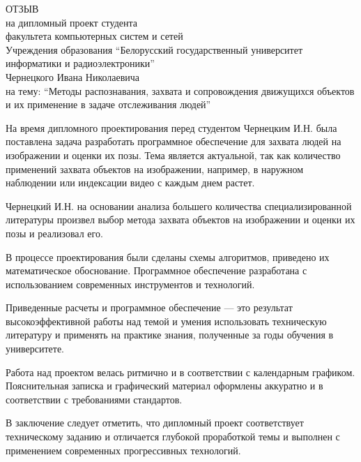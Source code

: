 \thispagestyle{empty}

\begin{singlespace}
  {\small
    \begin{center}
      \begin{minipage}{0.8\textwidth}
        \begin{center}
          {\normalsize ОТЗЫВ}\\[0.2cm]
          на дипломный проект студента\\
          факультета компьютерных систем и сетей\\
          Учреждения образования ``Белорусский государственный университет информатики и радиоэлектроники''\\
          Чернецкого Ивана Николаевича\\
          на тему: ``Методы распознавания, захвата и сопровождения движущихся объектов и их применение в задаче отслеживания людей''
        \end{center}
      \end{minipage}
    \end{center}

    На время дипломного проектирования перед студентом Чернецким И.Н. была поставлена задача разработать программное обеспечение для захвата людей на изображении и оценки их позы. Тема является актуальной, так как количество применений захвата объектов на изображении, например, в наружном наблюдении или индексации видео с каждым днем растет.

    Чернецкий И.Н. на основании анализа большего количества специализированной литературы произвел выбор метода захвата объектов на изображении и оценки их позы и реализовал его.

    В процессе проектирования были сделаны схемы алгоритмов, приведено их математическое обоснование. Программное обеспечение разработана с использованием современных инструментов и технологий.

    Приведенные расчеты и программное обеспечение --- это результат высокоэффективной работы над темой и умения использовать техническую литературу и применять на практике знания, полученные за годы обучения в университете.

    Работа над проектом велась ритмично и в соответствии с календарным графиком. Пояснительная записка и графический материал оформлены аккуратно и в соответствии с требованиями стандартов.

    В заключение следует отметить, что дипломный проект соответствует техническому заданию и отличается глубокой проработкой темы и выполнен с применением современных прогрессивных технологий.

}
\end{singlespace}
